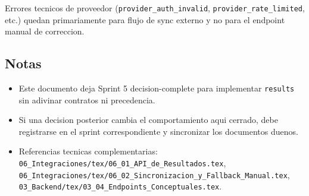 Errores tecnicos de proveedor (\texttt{provider\_auth\_invalid}, \texttt{provider\_rate\_limited}, etc.) quedan primariamente para flujo de sync externo y no para el endpoint manual de correccion.

\subsection{Notas}

\begin{itemize}
  \item Este documento deja Sprint 5 decision-complete para implementar \texttt{results} sin adivinar contratos ni precedencia.
  \item Si una decision posterior cambia el comportamiento aqui cerrado, debe registrarse en el sprint correspondiente y sincronizar los documentos duenos.
  \item Referencias tecnicas complementarias: \texttt{06\_Integraciones/tex/06\_01\_API\_de\_Resultados.tex}, \texttt{06\_Integraciones/tex/06\_02\_Sincronizacion\_y\_Fallback\_Manual.tex}, \texttt{03\_Backend/tex/03\_04\_Endpoints\_Conceptuales.tex}.
\end{itemize}
